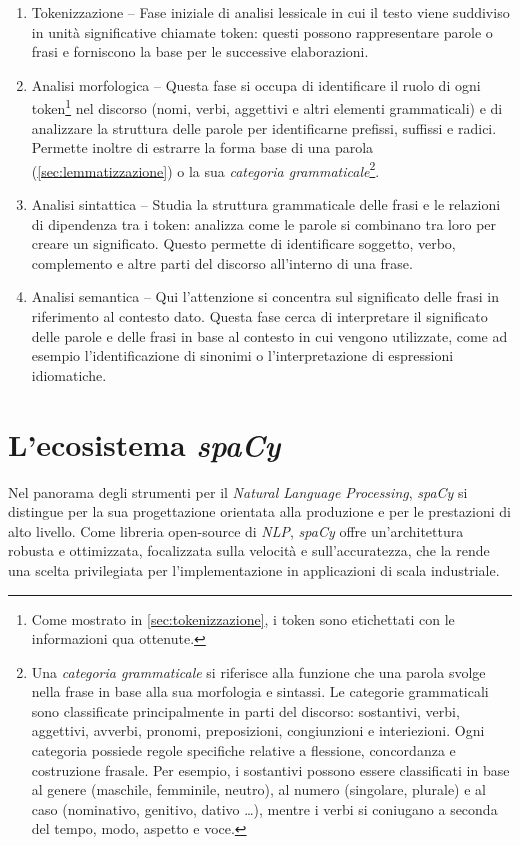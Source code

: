 \documentclass[12pt]{report}
\newcommand{\spacy}{\textsl{spaCy}\xspace}
\newcommand{\nlp}{\textsl{NLP}\xspace}
\begin{document}
\begin{enumerate}
\item \textsf{Tokenizzazione} -- Fase iniziale di analisi lessicale in cui il testo viene suddiviso in unità significative chiamate token: questi possono rappresentare parole o frasi e forniscono la base per le successive elaborazioni.
\item \textsf{Analisi morfologica} -- Questa fase si occupa di identificare il ruolo di ogni token\footnote{Come mostrato in \cref{sec:tokenizzazione}, i token sono etichettati con le informazioni qua ottenute.} nel discorso (nomi, verbi, aggettivi e altri elementi grammaticali) e di analizzare la struttura delle parole per identificarne prefissi, suffissi e radici. Permette inoltre di estrarre la forma base di una parola (\cref{sec:lemmatizzazione}) o la sua \textit{categoria grammaticale}\footnote{Una \textit{categoria grammaticale} si riferisce alla funzione che una parola svolge nella frase in base alla sua morfologia e sintassi. Le categorie grammaticali sono classificate principalmente in parti del discorso: sostantivi, verbi, aggettivi, avverbi, pronomi, preposizioni, congiunzioni e interiezioni. Ogni categoria possiede regole specifiche relative a flessione, concordanza e costruzione frasale. Per esempio, i sostantivi possono essere classificati in base al genere (maschile, femminile, neutro), al numero (singolare, plurale) e al caso (nominativo, genitivo, dativo \dots), mentre i verbi si coniugano a seconda del tempo, modo, aspetto e voce.}.
\item \textsf{Analisi sintattica} -- Studia la struttura grammaticale delle frasi e le relazioni di dipendenza tra i token: analizza come le parole si combinano tra loro per creare un significato. Questo permette di identificare soggetto, verbo, complemento e altre parti del discorso all'interno di una frase.
\item \textsf{Analisi semantica} -- Qui l'attenzione si concentra sul significato delle frasi in riferimento al contesto dato. Questa fase cerca di interpretare il significato delle parole e delle frasi in base al contesto in cui vengono utilizzate, come ad esempio l'identificazione di sinonimi o l'interpretazione di espressioni idiomatiche.
\end{enumerate}


\section{L'ecosistema \spacy}
Nel panorama degli strumenti per il \textit{Natural Language Processing}, \spacy si distingue per la sua progettazione orientata alla produzione e per le prestazioni di alto livello. Come libreria open-source di \nlp, \spacy offre un'architettura robusta e ottimizzata, focalizzata sulla velocità e sull'accuratezza, che la rende una scelta privilegiata per l'implementazione in applicazioni di scala industriale.
\end{document}

